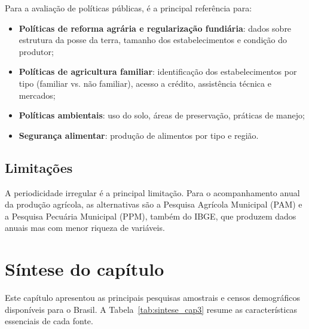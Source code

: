 Para a avaliação de políticas públicas, é a principal referência para:

\begin{itemize}
  \item \textbf{Políticas de reforma agrária e regularização fundiária}: dados sobre estrutura da posse da terra, tamanho dos estabelecimentos e condição do produtor;
  \item \textbf{Políticas de agricultura familiar}: identificação dos estabelecimentos por tipo (familiar vs. não familiar), acesso a crédito, assistência técnica e mercados;
  \item \textbf{Políticas ambientais}: uso do solo, áreas de preservação, práticas de manejo;
  \item \textbf{Segurança alimentar}: produção de alimentos por tipo e região.
\end{itemize}

\subsection{Limitações}

A periodicidade irregular é a principal limitação. Para o acompanhamento anual da produção agrícola, as alternativas são a Pesquisa Agrícola Municipal (PAM) e a Pesquisa Pecuária Municipal (PPM), também do IBGE, que produzem dados anuais mas com menor riqueza de variáveis.

\section{Síntese do capítulo}

Este capítulo apresentou as principais pesquisas amostrais e censos demográficos disponíveis para o Brasil. A Tabela~\ref{tab:sintese_cap3} resume as características essenciais de cada fonte.


